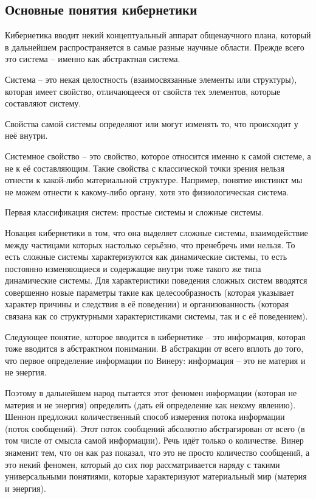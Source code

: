 \documentclass[main.tex]{subfiles}
\begin{document}
\subsection{Основные понятия кибернетики}


Кибернетика вводит некий концептуальный аппарат общенаучного плана, который в дальнейшем распространяется в самые разные научные области.
Прежде всего это система -- именно как абстрактная система.

Система -- это некая целостность (взаимосвязанные элементы или структуры), которая имеет свойство, отличающееся от свойств тех элементов, которые составляют систему.

Свойства самой системы определяют или могут изменять то, что происходит у неё внутри.

Системное свойство -- это свойство, которое относится именно к самой системе, а не к её составляющим.
Такие свойства с классической точки зрения нельзя отнести к какой-либо материальной структуре.
Например, понятие инстинкт мы не можем отнести к какому-либо органу, хотя это физиологическая система.

Первая классификация систем: простые системы и сложные системы.

Новация кибернетики в том, что она выделяет сложные системы, взаимодействие между частицами которых настолько серьёзно, что пренебречь ими нельзя.
То есть сложные системы характеризуются как динамические системы, то есть постоянно изменяющиеся и содержащие внутри тоже такого же типа динамические системы.
Для характеристики поведения сложных систем вводятся совершенно новые параметры такие как целесообразность (которая указывает характер причины и следствия в её поведении) и организованность (которая связана как со структурными характеристиками системы, так и с её поведением).


Следующее понятие, которое вводится в кибернетике -- это информация, которая тоже вводится в абстрактном понимании.
В абстракции от всего вплоть до того, что первое определение информации по Винеру: информация -- это не материя и не энергия.

Поэтому в дальнейшем народ пытается этот феномен информации (которая не материя и не энергия) определить (дать ей определение как некому явлению).
Шеннон предложил количественный способ измерения потока информации (поток сообщений).
Этот поток сообщений абсолютно абстрагирован от всего (в том числе от смысла самой информации).
Речь идёт только о количестве.
Винер знаменит тем, что он как раз показал, что это не просто количество сообщений, а это некий феномен, который до сих пор рассматривается наряду с такими универсальными понятиями, которые характеризуют материальный мир (материя и энергия).
\end{document}
